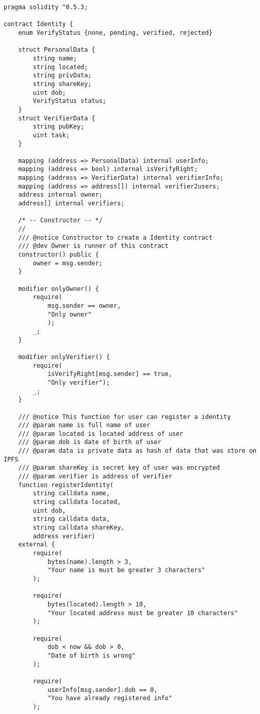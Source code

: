 \documentclass[../main-report.tex]{subfiles}
\begin{document}
\begin{lstlisting}
pragma solidity ^0.5.3;

contract Identity {
    enum VerifyStatus {none, pending, verified, rejected}

    struct PersonalData {
        string name;
        string located;
        string privData;
        string shareKey;
        uint dob;
        VerifyStatus status;
    }
    struct VerifierData {
        string pubKey;
        uint task;
    }

    mapping (address => PersonalData) internal userInfo;
    mapping (address => bool) internal isVerifyRight;
    mapping (address => VerifierData) internal verifierInfo;
    mapping (address => address[]) internal verifier2users;
    address internal owner;
    address[] internal verifiers;

    /* -- Constructor -- */
    //
    /// @notice Constructor to create a Identity contract
    /// @dev Owner is runner of this contract
    constructor() public {
        owner = msg.sender;
    }

    modifier onlyOwner() {
        require(
            msg.sender == owner,
            "Only owner"
            );
        _;
    }

    modifier onlyVerifier() {
        require(
            isVerifyRight[msg.sender] == true,
            "Only verifier");
        _;
    }

    /// @notice This function for user can register a identity
    /// @param name is full name of user
    /// @param located is located address of user
    /// @param dob is date of birth of user
    /// @param data is private data as hash of data that was store on IPFS
    /// @param shareKey is secret key of user was encrypted
    /// @param verifier is address of verifier
    function registerIdentity(
        string calldata name,
        string calldata located,
        uint dob,
        string calldata data,
        string calldata shareKey,
        address verifier)
    external {
        require(
            bytes(name).length > 3,
            "Your name is must be greater 3 characters"
        );

        require(
            bytes(located).length > 10,
            "Your located address must be greater 10 characters"
        );

        require(
            dob < now && dob > 0,
            "Date of birth is wrong"
        );

        require(
            userInfo[msg.sender].dob == 0,
            "You have already registered info"
        );


\end{lstlisting}
\end{document}

